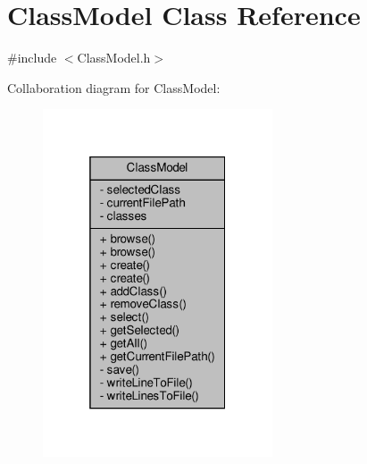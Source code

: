 \hypertarget{classClassModel}{}\section{Class\+Model Class Reference}
\label{classClassModel}


{\ttfamily \#include $<$Class\+Model.\+h$>$}



Collaboration diagram for Class\+Model\+:
\nopagebreak
\begin{figure}[H]
\begin{center}
\leavevmode
\includegraphics[width=193pt]{classClassModel__coll__graph}
\end{center}
\end{figure}
